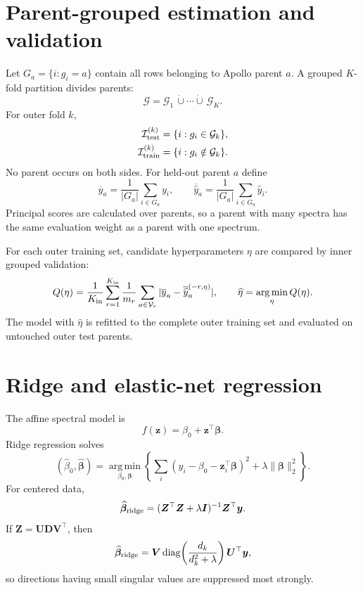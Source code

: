 \documentclass[11pt]{article}
\newcommand{\diag}{\operatorname{diag}}
\newcommand{\argmin}{\operatorname*{arg\,min}}
\begin{document}
\section{Parent-grouped estimation and validation}
Let $G_a=\{i:g_i=a\}$ contain all rows belonging to Apollo parent $a$. A grouped $K$-fold partition divides parents:
\begin{equation}
 \mathcal G=\mathcal G_1\,\dot\cup\cdots\dot\cup\,\mathcal G_K.
\end{equation}
For outer fold $k$,
\begin{align}
 \mathcal I_{\rm test}^{(k)}&=\{i:g_i\in\mathcal G_k\},\\
 \mathcal I_{\rm train}^{(k)}&=\{i:g_i\notin\mathcal G_k\}.
\end{align}
No parent occurs on both sides. For held-out parent $a$ define
\begin{equation}
 \overline y_a=\frac1{|G_a|}\sum_{i\in G_a}y_i,\qquad
 \overline{\widehat y}_a=\frac1{|G_a|}\sum_{i\in G_a}\widehat y_i.
\end{equation}
Principal scores are calculated over parents, so a parent with many spectra has the same evaluation weight as a parent with one spectrum.

For each outer training set, candidate hyperparameters $\eta$ are compared by inner grouped validation:
\begin{equation}
 Q(\eta)=\frac1{K_{\rm in}}\sum_{r=1}^{K_{\rm in}}
 \frac1{m_r}\sum_{a\in\mathcal V_r}
 |\overline y_a-\overline{\widehat y}_a^{(-r,\eta)}|,
 \qquad \widehat\eta=\argmin_\eta Q(\eta).
\end{equation}
The model with $\widehat\eta$ is refitted to the complete outer training set and evaluated on untouched outer test parents.

\section{Ridge and elastic-net regression}
The affine spectral model is
\begin{equation}
 f(\bm z)=\beta_0+\bm z^\top\bm\beta.
\end{equation}
Ridge regression solves
\begin{equation}
 (\widehat\beta_0,\widehat{\bm\beta})=
 \argmin_{\beta_0,\bm\beta}
 \left\{\sum_i(y_i-\beta_0-\bm z_i^\top\bm\beta)^2
 +\lambda\|\bm\beta\|_2^2\right\}.
\end{equation}
For centered data,
\begin{equation}
 \widehat{\bm\beta}_{\rm ridge}
 =(\bm Z^\top\bm Z+\lambda\bm I)^{-1}\bm Z^\top\bm y.
\end{equation}
If $\bm Z=\bm U\bm D\bm V^\top$, then
\begin{equation}
 \widehat{\bm\beta}_{\rm ridge}
 =\bm V\diag\!\left(\frac{d_k}{d_k^2+\lambda}\right)\bm U^\top\bm y,
\end{equation}
so directions having small singular values are suppressed most strongly.
\end{document}
